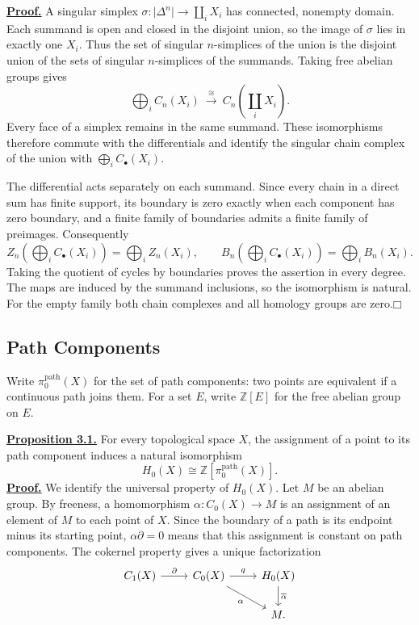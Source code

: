 \documentclass[11pt]{article}
\newcommand{\coursebold}[1]{{\color{burgundy}\textbf{#1}}}
\newcommand{\facehead}[1]{\subsection{#1}}
\begin{document}
\hypertarget{disjoint-proof}{}\coursebold{\hyperlink{disjoint-theorem}{Proof.}} A singular simplex $\sigma:\lvert\Delta^n\rvert\to\coprod_iX_i$ has connected, nonempty domain. Each summand is open and closed in the disjoint union, so the image of $\sigma$ lies in exactly one $X_i$. Thus the set of singular $n$-simplices of the union is the disjoint union of the sets of singular $n$-simplices of the summands. Taking free abelian groups gives
\[
\bigoplus_iC_n(X_i)\ \xrightarrow{\ \cong\ }\ C_n\!\left(\coprod_iX_i\right).
\]
Every face of a simplex remains in the same summand. These isomorphisms therefore commute with the differentials and identify the singular chain complex of the union with $\bigoplus_iC_\bullet(X_i)$.

The differential acts separately on each summand. Since every chain in a direct sum has finite support, its boundary is zero exactly when each component has zero boundary, and a finite family of boundaries admits a finite family of preimages. Consequently
\[
Z_n\!\left(\bigoplus_iC_\bullet(X_i)\right)=\bigoplus_i Z_n(X_i),
\qquad
B_n\!\left(\bigoplus_iC_\bullet(X_i)\right)=\bigoplus_i B_n(X_i).
\]
Taking the quotient of cycles by boundaries proves the assertion in every degree. The maps are induced by the summand inclusions, so the isomorphism is natural. For the empty family both chain complexes and all homology groups are zero.\hfill$\mdlgwhtsquare$

\facehead{Path Components}
Write $\pi_0^{\mathrm{path}}(X)$ for the set of path components: two points are equivalent if a continuous path joins them. For a set $E$, write $\mathbb Z[E]$ for the free abelian group on $E$.

\hypertarget{prop21}{}\coursebold{\hyperlink{proof21}{Proposition 3.1.}} For every topological space $X$, the assignment of a point to its path component induces a natural isomorphism
\[H_0(X)\cong\mathbb Z[\pi_0^{\mathrm{path}}(X)].\]
\hypertarget{proof21}{}\coursebold{\hyperlink{prop21}{Proof.}} We identify the universal property of $H_0(X)$. Let $M$ be an abelian group. By freeness, a homomorphism $\alpha:C_0(X)\to M$ is an assignment of an element of $M$ to each point of $X$. Since the boundary of a path is its endpoint minus its starting point, $\alpha\partial=0$ means that this assignment is constant on path components. The cokernel property gives a unique factorization
\[
\begin{tikzcd}
C_1(X)\arrow[r,"\partial"]&C_0(X)\arrow[r,"q"]\arrow[dr,"\alpha"']&H_0(X)\arrow[d,"\overline\alpha"]\\
&&M.
\end{tikzcd}
\]
\end{document}
